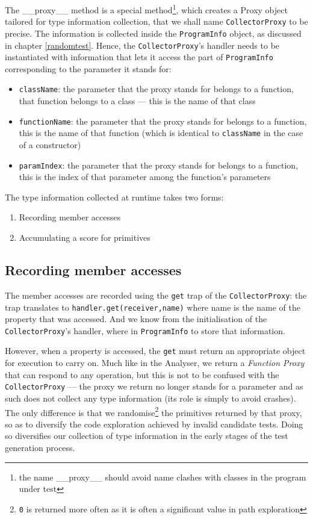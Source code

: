 The \_\_proxy\_\_ method is a special method\footnote{the name \_\_proxy\_\_ should avoid name clashes with classes in the program under test}, which creates a Proxy object tailored for type information collection, that we shall name \texttt{CollectorProxy} to be precise. The information is collected inside the \texttt{ProgramInfo} object, as discussed in chapter \ref{randomtest}. Hence, the \texttt{CollectorProxy}'s handler needs to be instantiated with information that lets it access the part of \texttt{ProgramInfo} corresponding to the parameter it stands for:

\begin{itemize}
   \item \texttt{className}: the parameter that the proxy stands for belongs to a function, that function belongs to a class --- this is the name of that class
   \item \texttt{functionName}: the parameter that the proxy stands for belongs to a function, this is the name of that function (which is identical to \texttt{className} in the case of a constructor)
   \item \texttt{paramIndex}: the parameter that the proxy stands for belongs to a function, this is the index of that parameter among the function's parameters
\end{itemize}

The type information collected at runtime takes two forms:

\begin{enumerate}
   \item Recording member accesses
   \item Accumulating a score for primitives
\end{enumerate}

\subsection{Recording member accesses}
The member accesses are recorded using the \texttt{get} trap of the \texttt{CollectorProxy}: the trap translates to \texttt{handler.get(receiver,name)} where name is the name of the property that was accessed. And we know from the initialisation of the \texttt{CollectorProxy}'s handler, where in \texttt{ProgramInfo} to store that information.

However, when a property is accessed, the \texttt{get} must return an appropriate object for execution to carry on. Much like in the \textsf{Analyser}, we return a \emph{Function Proxy} that can respond to any operation, but this is not to be confused with the \texttt{CollectorProxy} --- the proxy we return no longer stands for a parameter and as such does not collect any type information (its role is simply to avoid crashes). The only difference is that we randomise\footnote{\texttt{0} is returned more often as it is often a significant value in path exploration} the primitives returned by that proxy, so as to diversify the code exploration achieved by invalid candidate tests. Doing so diversifies our collection of type information in the early stages of the test generation process.

